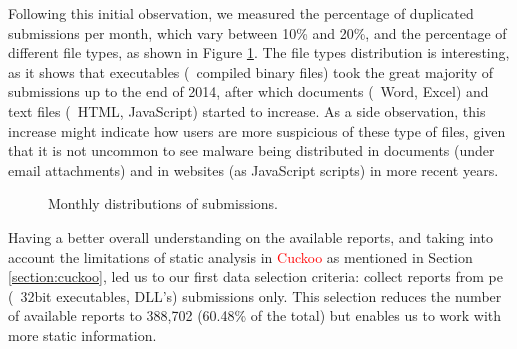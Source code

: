 Following this initial observation, we measured the percentage of duplicated submissions per month, which vary between 10\% and 20\%, and the percentage of different file types, as shown in Figure \ref{fig:monthly_distributions}.
The file types distribution is interesting, as it shows that executables (\ie\ compiled binary files) took the great majority of submissions up to the end of 2014, after which documents (\eg\ Word, Excel) and text files (\eg\ HTML, JavaScript) started to increase.
As a side observation, this increase might indicate how users are more suspicious of these type of files, given that it is not uncommon to see malware being distributed in documents (under email attachments) and in websites (as JavaScript scripts) in more recent years.

\begin{figure}[!htb]
	\centering
	\begin{subfigmatrix}{2}
	\end{subfigmatrix}
	\caption[Monthly distributions of submissions.]{Monthly distributions of submissions.}
	\label{fig:monthly_distributions}
\end{figure}

Having a better overall understanding on the available reports, and taking into account the limitations of static analysis in \textcolor{red}{Cuckoo} as mentioned in Section \ref{section:cuckoo}, led us to our first data selection criteria: collect reports from \gls{pe} (\eg\ 32bit executables, DLL's) submissions only.
This selection reduces the number of available reports to 388,702 (60.48\% of the total) but enables us to work with more static information.

